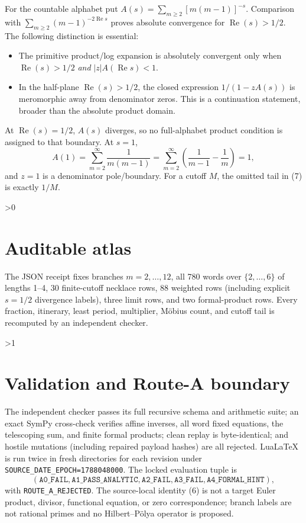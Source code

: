 \documentclass[10pt]{article}
\begin{document}
For the countable alphabet put $A(s)=\sum_{m\ge2}[m(m-1)]^{-s}$.  Comparison
with $\sum_{m\ge2}(m-1)^{-2\operatorname{Re}s}$ proves absolute convergence
for $\operatorname{Re}(s)>1/2$.  The following distinction is essential:
\begin{itemize}
\item The primitive product/log expansion is absolutely convergent only when
  $\operatorname{Re}(s)>1/2$ \emph{and} $|z|A(\operatorname{Re}s)<1$.
\item In the half-plane $\operatorname{Re}(s)>1/2$, the closed expression
  $1/(1-zA(s))$ is meromorphic away from denominator zeros.  This is a
  continuation statement, broader than the absolute product domain.
\end{itemize}
At $\operatorname{Re}(s)=1/2$, $A(s)$ diverges, so no full-alphabet product
condition is assigned to that boundary.  At $s=1$,
\begin{equation}
 A(1)=\sum_{m=2}^{\infty}\frac1{m(m-1)}
 =\sum_{m=2}^{\infty}\left(\frac1{m-1}-\frac1m\right)=1,              \tag{7}
\end{equation}
and $z=1$ is a denominator pole/boundary.  For a cutoff $M$, the omitted tail
in (7) is exactly $1/M$.

\ifnum\CRevisionRound>0
\section{Auditable atlas}
The JSON receipt fixes branches $m=2,\ldots,12$, all 780 words over
$\{2,\ldots,6\}$ of lengths 1--4, 30 finite-cutoff necklace rows, 88 weighted
rows (including explicit $s=1/2$ divergence labels), three limit rows, and two
formal-product rows.  Every fraction, itinerary, least period, multiplier,
M\"obius count, and cutoff tail is recomputed by an independent checker.
\fi

\ifnum\CRevisionRound>1
\section{Validation and Route-A boundary}
The independent checker passes its full recursive schema and arithmetic suite;
an exact SymPy cross-check verifies affine inverses, all word fixed equations,
the telescoping sum, and finite formal products; clean replay is byte-identical;
and hostile mutations (including repaired payload hashes) are all rejected.
LuaLaTeX is run twice in fresh directories for each revision under
\texttt{SOURCE\_DATE\_EPOCH=1788048000}.  The locked evaluation tuple is
\begin{equation*}
(\mathtt{A0\_FAIL},\mathtt{A1\_PASS\_ANALYTIC},\mathtt{A2\_FAIL},
 \mathtt{A3\_FAIL},\mathtt{A4\_FORMAL\_HINT}),
\end{equation*}
with \texttt{ROUTE\_A\_REJECTED}.  The source-local identity (6) is not a
target Euler product, divisor, functional equation, or zero correspondence;
branch labels are not rational primes and no Hilbert--P\"olya operator is
proposed.
\fi
\end{document}
